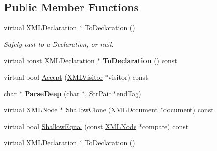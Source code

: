 \subsection*{Public Member Functions}
\begin{DoxyCompactItemize}
\item 
\mbox{\label{classtinyxml2_1_1XMLDeclaration_a159d8ac45865215e88059ea1e5b52fc5}} 
virtual \hyperlink{classtinyxml2_1_1XMLDeclaration}{X\+M\+L\+Declaration} $\ast$ \hyperlink{classtinyxml2_1_1XMLDeclaration_a159d8ac45865215e88059ea1e5b52fc5}{To\+Declaration} ()
\begin{DoxyCompactList}\small\item\em Safely cast to a Declaration, or null. \end{DoxyCompactList}\item 
\mbox{\label{classtinyxml2_1_1XMLDeclaration_aa20c3315b18c3b88830dccf5c493259b}} 
virtual const \hyperlink{classtinyxml2_1_1XMLDeclaration}{X\+M\+L\+Declaration} $\ast$ {\bfseries To\+Declaration} () const
\item 
virtual bool \hyperlink{classtinyxml2_1_1XMLDeclaration_acf47629d9fc08ed6f1c164a97bcf794b}{Accept} (\hyperlink{classtinyxml2_1_1XMLVisitor}{X\+M\+L\+Visitor} $\ast$visitor) const
\item 
\mbox{\label{classtinyxml2_1_1XMLDeclaration_a19e33e0a9f9500f449261558c36f9a44}} 
char $\ast$ {\bfseries Parse\+Deep} (char $\ast$, \hyperlink{classtinyxml2_1_1StrPair}{Str\+Pair} $\ast$end\+Tag)
\item 
virtual \hyperlink{classtinyxml2_1_1XMLNode}{X\+M\+L\+Node} $\ast$ \hyperlink{classtinyxml2_1_1XMLDeclaration_ad9d60e6d2df75c13eb6bf7319985b747}{Shallow\+Clone} (\hyperlink{classtinyxml2_1_1XMLDocument}{X\+M\+L\+Document} $\ast$document) const
\item 
virtual bool \hyperlink{classtinyxml2_1_1XMLDeclaration_ae8b4d3a399857029f36c322b0801b69c}{Shallow\+Equal} (const \hyperlink{classtinyxml2_1_1XMLNode}{X\+M\+L\+Node} $\ast$compare) const
\item 
\mbox{\label{classtinyxml2_1_1XMLDeclaration_a159d8ac45865215e88059ea1e5b52fc5}} 
virtual \hyperlink{classtinyxml2_1_1XMLDeclaration}{X\+M\+L\+Declaration} $\ast$ \hyperlink{classtinyxml2_1_1XMLDeclaration_a159d8ac45865215e88059ea1e5b52fc5}{To\+Declaration} ()

\end{DoxyCompactItemize}
